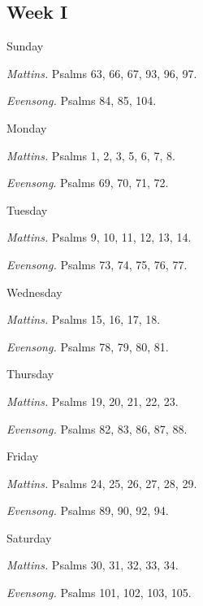 \begin{paracol}{2}%
	\begin{leftcolumn}
		\subsection{Week I}
		\begin{inhead}
			Sunday
		\end{inhead}\par\noindent
		\textit{Mattins.} Psalms 63, 66, 67, 93, 96, 97.\par\noindent
		\textit{Evensong.} Psalms 84, 85, 104.\par
		\begin{inhead}
			Monday
		\end{inhead}\par\noindent
		\textit{Mattins.} Psalms 1, 2, 3, 5, 6, 7, 8.\par\noindent
		\textit{Evensong}. Psalms 69, 70, 71, 72.\par
		\begin{inhead}
			Tuesday
		\end{inhead}\par\noindent
		\textit{Mattins.} Psalms 9, 10, 11, 12, 13, 14.\par\noindent
		\textit{Evensong.} Psalms 73, 74, 75, 76, 77.\par
		\begin{inhead}
			Wednesday
		\end{inhead}\par\noindent
		\textit{Mattins.} Psalms 15, 16, 17, 18.\par\noindent
		\textit{Evensong.} Psalms 78, 79, 80, 81.\par
		\begin{inhead}
			Thursday
		\end{inhead}\par\noindent
		\textit{Mattins.} Psalms 19, 20, 21, 22, 23.\par\noindent
		\textit{Evensong.} Psalms 82, 83, 86, 87, 88.\par
		\begin{inhead}
			Friday
		\end{inhead}\par\noindent
		\textit{Mattins.} Psalms 24, 25, 26, 27, 28, 29.\par\noindent
		\textit{Evensong.} Psalms 89, 90, 92, 94.\par
		\begin{inhead}
			Saturday
		\end{inhead}\par\noindent
		\textit{Mattins.} Psalms 30, 31, 32, 33, 34.\par\noindent
		\textit{Evensong.} Psalms 101, 102, 103, 105.\par
		

\end{leftcolumn}
\end{paracol}
